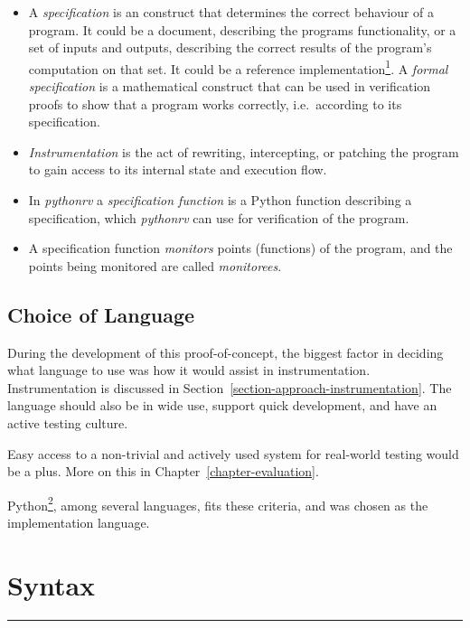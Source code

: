 \documentclass[a4paper,11pt]{kth-mag}
\begin{document}
\begin{itemize}
	\item A \textit{specification} is an construct that determines the correct
		behaviour of a program. It could be a document, describing the programs
		functionality, or a set of inputs and outputs, describing the correct
		results of the program's computation on that set. It could be a reference
		implementation\footnote{For instance, the only specification for python is
		the canonical CPython implementation. Python is defined as ``what CPython
		does''.}. A \textit{formal specification} is a mathematical construct that
		can be used in verification proofs to show that a program works correctly,
		i.e.\ according to its specification.

	\item \textit{Instrumentation} is the act of rewriting, intercepting, or
		patching the program to gain access to its internal state and execution
		flow.

	\item In \textit{pythonrv} a \textit{specification function} is a Python
		function describing a specification, which \textit{pythonrv} can use for
		verification of the program.

	\item A specification function
		\textit{monitors} points (functions) of the program, and the points being
		monitored are called \textit{monitorees}.
\end{itemize}

\subsection{Choice of Language}

During the development of this proof-of-concept, the biggest factor in deciding
what language to use was how it would assist in instrumentation.
Instrumentation is discussed in Section~\ref{section-approach-instrumentation}.
The language should also be in wide use, support quick development, and have an
active testing culture.

Easy access to a non-trivial and actively used system for real-world testing
would be a plus. More on this in Chapter~\ref{chapter-evaluation}.

Python\footnote{\texttt{http://www.python.org}}, among several languages, fits
these criteria, and was chosen as the implementation language.

\section{Syntax} \label{section-approach-syntax}
\end{document}
